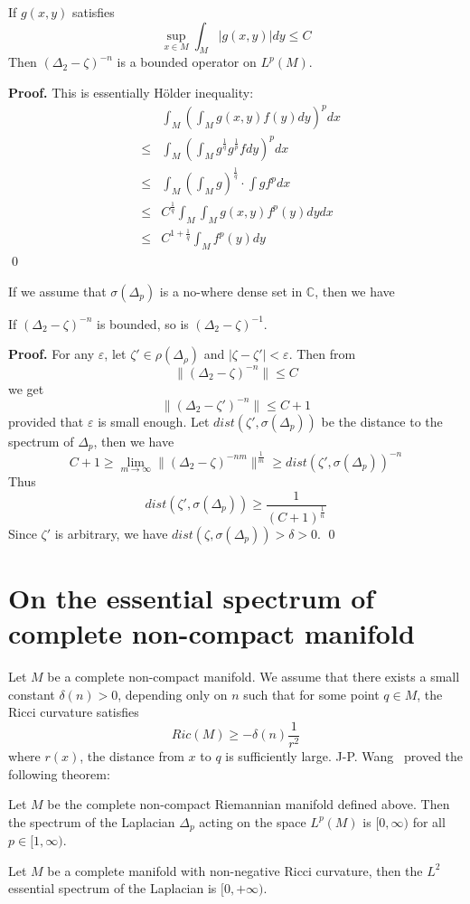 \begin{lemma}
If $g(x,y)$ satisfies
\[
\sup_{x\in M}\int_M |g(x,y)|dy \leqslant C
\]
Then $(\Delta_2 - \zeta)^{-n}$ is a bounded operator on $L^p(M)$.
\end{lemma}
{\bf Proof.}
This is essentially H\"{o}lder inequality:
\begin{eqnarray}
\nonumber & & \int_M \left(\int_M g(x,y)f(y)dy\right)^p dx \\
\nonumber & \leqslant 
& \int_M \left(\int_M g^{\frac{1}{q}}g^{\frac{1}{p}}fdy\right)^p dx \\
\nonumber & \leqslant & \int_M\left(\int_M g\right)^{\frac{1}{q}} \cdot 
\int gf^p dx \\
\nonumber & \leqslant & C^{\frac{1}{q}} \int_M\int_M g(x,y)f^p(y)dydx \\
\nonumber & \leqslant & C^{1+\frac{1}{q}}\int_M f^p(y)dy
\end{eqnarray}
\qed

If we assume that $\sigma(\Delta_p)$ is a no-where dense set in $\mathbb{C}$,
then we have
\begin{lemma}
If $(\Delta_2 - \zeta)^{-n}$ is bounded, so is $(\Delta_2 - \zeta)^{-1}$.
\end{lemma}
{\bf Proof.}
For any $\varepsilon$, let $\zeta '\in\rho(\Delta_\rho)$ and 
$|\zeta - \zeta '| < \varepsilon$. Then from
\[
\|(\Delta_2 - \zeta)^{-n}\| \leqslant C
\]
we get
\[
\|(\Delta_2 - \zeta ')^{-n}\| \leqslant C+1
\]
provided that $\varepsilon$ is small enough. Let 
$dist(\zeta ', \sigma(\Delta_p))$ be the distance to the spectrum of $\Delta_p$,
then we have
\[
C+1 \geqslant \lim_{m\rightarrow \infty} \|(\Delta_2 - 
\zeta)^{-nm}\|^{\frac{1}{m}} \geqslant dist(\zeta ', \sigma(\Delta_p))^{-n}
\]
Thus
\[
dist(\zeta ', \sigma(\Delta_p)) \geqslant \frac{1}{(C+1)^{\frac{1}{n}}}
\]
Since $\zeta '$ is arbitrary, we have 
$dist(\zeta, \sigma(\Delta_p)) > \delta > 0$.
\qed
\section{On the essential spectrum of complete non-compact manifold}\label{Spec_II}
Let  $M$ be a complete non-compact manifold.
We assume that  there exists a small constant $\delta(n) > 0$, depending only on
$n$ such that for some point $q\in M$, the Ricci curvature satisfies
\[
Ric(M) \geqslant -\delta(n)\frac{1}{r^2}
\]
where $r(x)$, the distance from $x$ to $q$ is sufficiently large.
J-P. Wang~\cite{wang} proved the following theorem:
\begin{theorem}
Let $M$ be the complete non-compact Riemannian manifold defined above. Then the spectrum of the
Laplacian $\Delta_p$ acting on the space $L^p(M)$ is $[0, \infty)$ for all
$p\in[1,\infty)$.
\end{theorem}
\begin{corollary}
Let $M$ be a complete manifold with non-negative Ricci curvature, then the $L^2$
essential spectrum of the Laplacian is $[0, +\infty)$.
\end{corollary}



